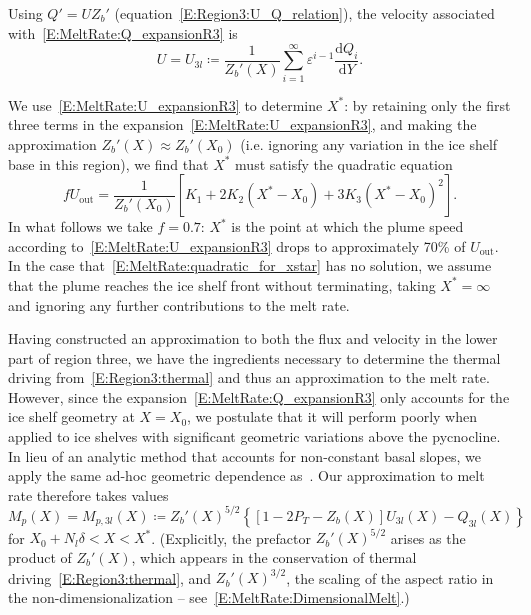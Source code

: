 \documentclass[openacc]{rsproca_new}%
\newcommand{\dd}[2]{\frac{\mathrm{d} #1}{\mathrm{d} #2}}
\newcommand{\lt}{\delta} %
\newcommand{\Pt}{\textit{P}_T}
\newcommand{\out}{\text{out}}
\begin{document}
Using $Q' = U Z_b'$ (equation~\eqref{E:Region3:U_Q_relation}), the velocity associated with~\eqref{E:MeltRate:Q_expansionR3} is
 \begin{equation}\label{E:MeltRate:U_expansionR3}
U = U_{3l} \coloneqq \frac{1}{Z_b'(X)} \sum_{i = 1}^{\infty} \varepsilon^{i-1} \dd{Q_i}{Y}.
\end{equation}

We use~\eqref{E:MeltRate:U_expansionR3} to determine $X^*$: by retaining only the first three terms in the expansion~\eqref{E:MeltRate:U_expansionR3}, and making the approximation  $Z_b'(X) \approx Z_b'(X_0)$ (i.e. ignoring any variation in the ice shelf base in this region), we find that $X^*$ must satisfy the quadratic equation
\begin{equation}\label{E:MeltRate:quadratic_for_xstar}
f U_\out = \frac{1}{Z_b'(X_0)}\left[K_1 + 2 K_2(X^* - X_0) + 3K_3(X^* - X_0)^2 \right].
\end{equation}
In what follows we take $f = 0.7$: $X^*$ is the point at which the plume speed according to~\eqref{E:MeltRate:U_expansionR3} drops to approximately 70\% of $U_\out$. In the case that~\eqref{E:MeltRate:quadratic_for_xstar} has no solution, we assume that the plume reaches the ice shelf front without terminating, taking $X^* = \infty$ and ignoring any further contributions to the melt rate.

Having constructed an approximation to both the flux and velocity in the lower part of region three, we have the ingredients necessary to determine the thermal driving from~\eqref{E:Region3:thermal} and thus an approximation to the melt rate. However, since the expansion~\eqref{E:MeltRate:Q_expansionR3} only accounts for the ice shelf geometry at $X = X_0$, we postulate that it will perform poorly when applied to ice shelves with significant geometric variations above the pycnocline. In lieu of an analytic method that accounts for non-constant basal slopes, we apply the same ad-hoc geometric dependence as~\citet{Lazeroms2018TheCryo}. Our approximation to melt rate therefore takes values
\begin{equation}\label{E:MeltRate:regions3_l}
M_{p}(X) = M_{p,3l}(X)\coloneqq Z_b'(X)^{5/2}\left\{\left[1  - 2\Pt -  Z_b(X)\right] U_{3l}(X) - Q_{3l}(X)\right\}
\end{equation}
for $X_0 + N_l \lt < X < X^*$. (Explicitly, the prefactor $Z_b'(X)^{5/2}$ arises as the product of $Z_b'(X)$, which appears in the conservation of thermal driving~\eqref{E:Region3:thermal}, and $Z_b'(X)^{3/2}$, the scaling of the aspect ratio in the non-dimensionalization -- see~\eqref{E:MeltRate:DimensionalMelt}.)
\end{document}

